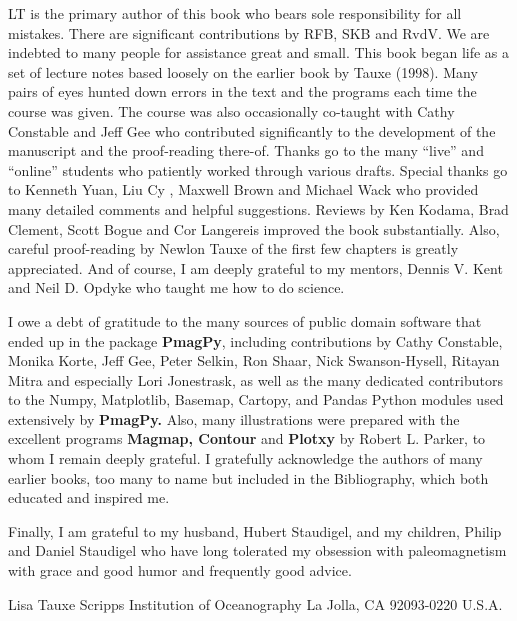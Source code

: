 LT is the primary author of this book who bears sole responsibility for all mistakes.  There are significant contributions by RFB, SKB and RvdV.     We are indebted to many people for assistance
great and small.  This book began life as a set of lecture notes based loosely on the earlier book by Tauxe (1998).  Many pairs of
eyes hunted down errors  in the text
and  the programs each time the course was given.  The course was also occasionally co-taught with Cathy Constable and Jeff Gee who contributed significantly to  the development of the manuscript and the proof-reading there-of.   Thanks go to the many ``live'' and ``online'' students who patiently worked through various drafts.  Special thanks go to Kenneth Yuan,  Liu Cy , Maxwell Brown and Michael Wack who provided many detailed comments and helpful suggestions.   Reviews by Ken Kodama, Brad Clement, Scott Bogue and Cor Langereis improved the book substantially.   Also, careful proof-reading by Newlon Tauxe of the first few chapters is greatly appreciated.  And of course, I am deeply grateful to my mentors, Dennis V. Kent and Neil D. Opdyke who taught me how to do science. 


I owe a debt of gratitude to the many sources of public domain software that
ended up in the package {\bf PmagPy}, including contributions by  Cathy Constable, Monika Korte, Jeff Gee, Peter Selkin,  Ron Shaar, Nick Swanson-Hysell,  Ritayan Mitra and especially Lori Jonestrask,  as well as the many dedicated contributors to the Numpy, Matplotlib,  Basemap, Cartopy, and Pandas  Python modules used extensively by {\bf PmagPy.}  Also, many illustrations were prepared with the excellent programs {\bf Magmap, Contour} and {\bf Plotxy} by Robert L. Parker, to whom I remain deeply grateful.  
I  gratefully acknowledge   the authors of many earlier  books, too many to name but included in the Bibliography,  which both educated and inspired me.


Finally, I am   grateful to my husband, Hubert Staudigel,  and my children, Philip and Daniel Staudigel who have long tolerated my obsession with paleomagnetism with grace and good humor and frequently good advice. 



\vskip 18pt
{\obeylines
Lisa Tauxe
Scripps Institution of Oceanography
La Jolla, CA 92093-0220
U.S.A.
}


